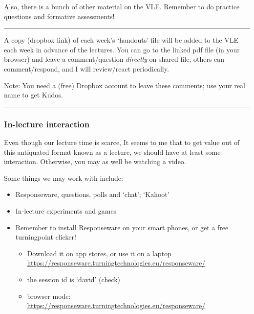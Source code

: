 \documentclass[]{article}
\providecommand{\tightlist}{%
  \setlength{\itemsep}{0pt}\setlength{\parskip}{0pt}}
\begin{document}
Also, there is a bunch of other material on the VLE. Remember to do
practice questions and formative assessments!

\begin{center}\rule{0.5\linewidth}{\linethickness}\end{center}

A copy (dropbox link) of each week's `handouts' file will be added to
the VLE each week in advance of the lectures. You can go to the linked
pdf file (in your browser) and leave a comment/question \emph{directly}
on shared file, others can comment/respond, and I will review/react
periodically.

Note: You need a (free) Dropbox account to leave these comments; use
your real name to get Kudos.

\begin{center}\rule{0.5\linewidth}{\linethickness}\end{center}

\hypertarget{in-lecture-interaction}{%
\subsubsection{In-lecture interaction}\label{in-lecture-interaction}}

Even though our lecture time is scarce, It seems to me that to get value
out of this antiquated format known as a lecture, we should have at
least some interaction. Otherwise, you may as well be watching a video.

Some things we may work with include:

\begin{itemize}
\item
  Responseware, questions, polls and `chat'; `Kahoot'
\item
  In-lecture experiments and games
\item
  Remember to install Responseware on your smart phones, or get a free
  turningpoint clicker!

  \begin{itemize}
  \tightlist
  \item
    Download it on app stores, or use it on a laptop
    \url{https://responseware.turningtechnologies.eu/responseware/}
  \item
    the session id is `david' (check)
  \item
    browser mode:
    \url{https://responseware.turningtechnologies.eu/responseware/}
  \end{itemize}
\end{itemize}
\end{document}
